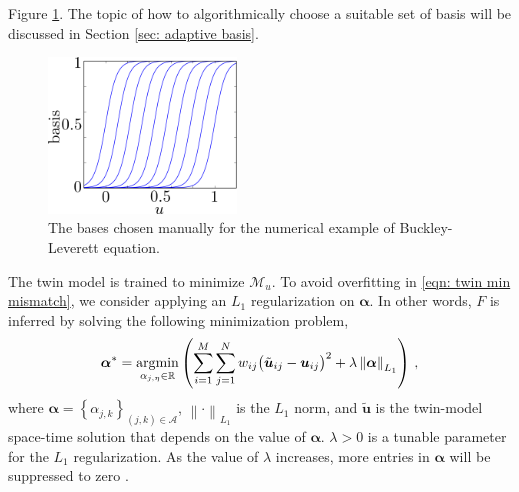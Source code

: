 Figure \ref{fig: sigmoid basis ad hoc}.
The topic of
how to algorithmically choose a suitable set of basis will be discussed 
in Section \ref{sec: adaptive basis}.\\
\begin{figure}[htbp]
    \begin{center}
        \includegraphics[width=5cm]{../fixed_basis_eg.png}
        \caption{The bases chosen manually for the numerical example of Buckley-Leverett equation.}
        \label{fig: sigmoid basis ad hoc}
    \end{center}
\end{figure}


The twin model is trained to minimize $\mathcal{M}_u$.
To avoid overfitting in \eqref{eqn: twin min mismatch}, we consider applying an
$L_1$ regularization on $\boldsymbol{\alpha}$. In other words,
$F$ is inferred by solving the following minimization problem,
\begin{equation}
    \boldsymbol{\alpha}^* = \operatorname*{\arg\!\min}_{\alpha_{j, \eta}\in \mathbb{R}} \left(
    \sum_{i=1}^M \sum_{j=1}^N w_{ij} \big( \tilde{\boldsymbol{u}}_{ij}
     -\boldsymbol{u}_{ij}\big)^2
 + \lambda\left\|\boldsymbol{\alpha}\right\|_{L_1} \right)
    \,,
    \label{eqn: solution mismatch L1 norm}
\end{equation}
where $\boldsymbol{\alpha} = \left\{\alpha_{j,k}\right\}_{\left(j,k\right)\in \mathcal{A}}$, 
$\left\|\cdot\right\|_{L_1}$ is the $L_1$ norm, and
$\tilde{\boldsymbol{u}}$ is the twin-model space-time solution that depends on the value of
$\boldsymbol{\alpha}$.
$\lambda>0$ is a tunable parameter for
the $L_1$ regularization. As the value of $\lambda$ increases, more entries in $\boldsymbol{\alpha}$
will be suppressed to zero
\cite{Lasso variable selection}. \\


